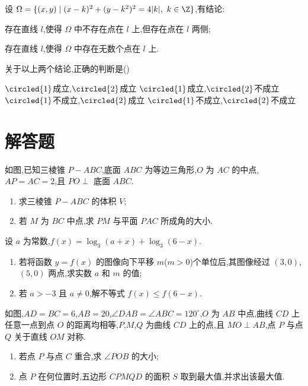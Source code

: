 \begin{problem}
设 \(\Omega=\{(x,y)\mid (x-k)^2+(y-k^2)^2=4|k|,\ k\in\Z\}\),有结论:
\begin{circlelist}
\item 存在直线 \(l\),使得 \(\Omega\) 中不存在点在 \(l\) 上,但存在点在 \(l\) 两侧;
\item 存在直线 \(l\),使得 \(\Omega\) 中存在无数个点在 \(l\) 上.
\end{circlelist}
关于以上两个结论,正确的判断是(\quad)

\choices
    {\(\circled{1}\)成立,\(\circled{2}\)成立}
    {\(\circled{1}\)成立,\(\circled{2}\)不成立}
    {\(\circled{1}\)不成立,\(\circled{2}\)成立}
    {\(\circled{1}\)不成立,\(\circled{2}\)不成立}
\end{problem}

\section{解答题}

\begin{problem}
如图,已知三棱锥 \(P-ABC\),底面 \(ABC\) 为等边三角形,\(O\) 为 \(AC\) 的中点,\(AP=AC=2\),且 \(PO\perp\) 底面 \(ABC\).
\begin{enumerate}
\item 求三棱锥 \(P-ABC\) 的体积 \(V\);
\item 若 \(M\) 为 \(BC\) 中点,求 \(PM\) 与平面 \(PAC\) 所成角的大小.
\end{enumerate}

\end{problem}

\begin{problem}
设 \(a\) 为常数,\(f(x)=\log_3(a+x)+\log_3(6-x)\).
\begin{enumerate}
\item 若将函数 \(y=f(x)\) 的图像向下平移 \(m\)(\(m>0\))个单位后,其图像经过 \((3,0)\),\((5,0)\) 两点,求实数 \(a\) 和 \(m\) 的值;
\item 若 \(a>-3\) 且 \(a\ne0\),解不等式 \(f(x)\le f(6-x)\).
\end{enumerate}
\end{problem}

\begin{problem}
如图,\(AD=BC=6\),\(AB=20\),\(\angle DAB=\angle ABC=120^\circ\),\(O\) 为 \(AB\) 中点,曲线 \(CD\) 上任意一点到点 \(O\) 的距离均相等,\(P\),\(M\),\(Q\) 为曲线 \(CD\) 上的点,且 \(MO\perp AB\),点 \(P\) 与点 \(Q\) 关于直线 \(OM\) 对称.
\begin{enumerate}
\item 若点 \(P\) 与点 \(C\) 重合,求 \(\angle POB\) 的大小;
\item 点 \(P\) 在何位置时,五边形 \(CPMQD\) 的面积 \(S\) 取到最大值,并求出该最大值.
\end{enumerate}

\end{problem}

